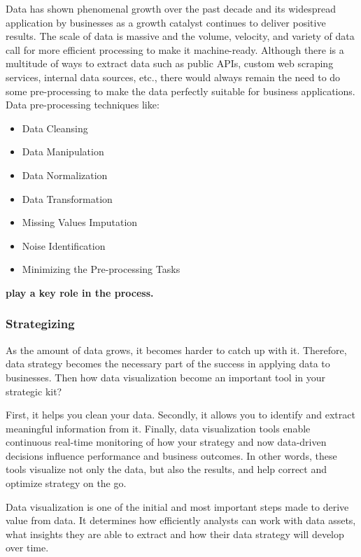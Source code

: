 \documentclass[]{book}
\providecommand{\tightlist}{%
  \setlength{\itemsep}{0pt}\setlength{\parskip}{0pt}}
\begin{document}
Data has shown phenomenal growth over the past decade and its widespread
application by businesses as a growth catalyst continues to deliver
positive results. The scale of data is massive and the volume, velocity,
and variety of data call for more efficient processing to make it
machine-ready. Although there is a multitude of ways to extract data
such as public APIs, custom web scraping services, internal data
sources, etc., there would always remain the need to do some
pre-processing to make the data perfectly suitable for business
applications. Data pre-processing techniques like:

\begin{itemize}
\tightlist
\item
  Data Cleansing
\item
  Data Manipulation
\item
  Data Normalization
\item
  Data Transformation
\item
  Missing Values Imputation
\item
  Noise Identification
\item
  Minimizing the Pre-processing Tasks
\end{itemize}

\textbf{play a key role in the process.}

\subsubsection{Strategizing}\label{strategizing}

As the amount of data grows, it becomes harder to catch up with it.
Therefore, data strategy becomes the necessary part of the success in
applying data to businesses. Then how data visualization become an
important tool in your strategic kit?

First, it helps you clean your data. Secondly, it allows you to identify
and extract meaningful information from it. Finally, data visualization
tools enable continuous real-time monitoring of how your strategy and
now data-driven decisions influence performance and business outcomes.
In other words, these tools visualize not only the data, but also the
results, and help correct and optimize strategy on the go.

Data visualization is one of the initial and most important steps made
to derive value from data. It determines how efficiently analysts can
work with data assets, what insights they are able to extract and how
their data strategy will develop over time.
\end{document}
